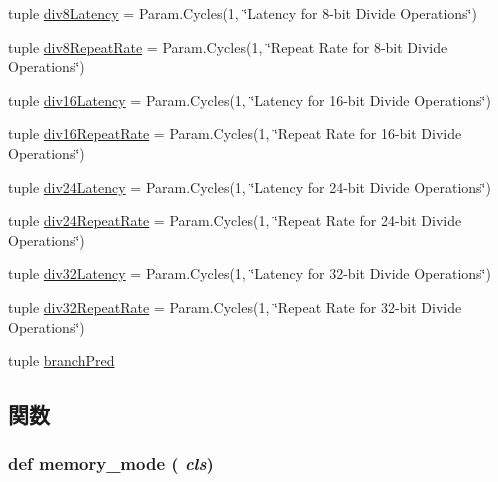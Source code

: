\begin{DoxyCompactItemize}
tuple \hyperlink{classInOrderCPU_1_1InOrderCPU_a833c322d9e4b4bef952d030a08320497}{div8Latency} = Param.Cycles(1, \char`\"{}Latency for 8-\/bit Divide Operations\char`\"{})
\item 
tuple \hyperlink{classInOrderCPU_1_1InOrderCPU_a736a65eafa168f467a9a36e107b331e6}{div8RepeatRate} = Param.Cycles(1, \char`\"{}Repeat Rate for 8-\/bit Divide Operations\char`\"{})
\item 
tuple \hyperlink{classInOrderCPU_1_1InOrderCPU_a060046a1d58d586e6d65b6dfb868ef96}{div16Latency} = Param.Cycles(1, \char`\"{}Latency for 16-\/bit Divide Operations\char`\"{})
\item 
tuple \hyperlink{classInOrderCPU_1_1InOrderCPU_a2a96d4b0aa6b3dfc9a5fcd7f830a51f9}{div16RepeatRate} = Param.Cycles(1, \char`\"{}Repeat Rate for 16-\/bit Divide Operations\char`\"{})
\item 
tuple \hyperlink{classInOrderCPU_1_1InOrderCPU_a54b0720449ef5f17f05d541a895c1017}{div24Latency} = Param.Cycles(1, \char`\"{}Latency for 24-\/bit Divide Operations\char`\"{})
\item 
tuple \hyperlink{classInOrderCPU_1_1InOrderCPU_ab804bac6417fc4bbdbf4cee8466a689c}{div24RepeatRate} = Param.Cycles(1, \char`\"{}Repeat Rate for 24-\/bit Divide Operations\char`\"{})
\item 
tuple \hyperlink{classInOrderCPU_1_1InOrderCPU_ab5c92c70e2ba81c832ffe484375fd29f}{div32Latency} = Param.Cycles(1, \char`\"{}Latency for 32-\/bit Divide Operations\char`\"{})
\item 
tuple \hyperlink{classInOrderCPU_1_1InOrderCPU_a5dc41b764ba517eb08a9d7297e292748}{div32RepeatRate} = Param.Cycles(1, \char`\"{}Repeat Rate for 32-\/bit Divide Operations\char`\"{})
\item 
tuple \hyperlink{classInOrderCPU_1_1InOrderCPU_ac566dd90d96e45183abc6f54c960ffec}{branchPred}
\end{DoxyCompactItemize}


\subsection{関数}
\hypertarget{classInOrderCPU_1_1InOrderCPU_a53d73a2f804df6a1dcabb22052d09773}{
\subsubsection[{memory\_\-mode}]{\setlength{\rightskip}{0pt plus 5cm}def memory\_\-mode ( {\em cls})}}
\label{classInOrderCPU_1_1InOrderCPU_a53d73a2f804df6a1dcabb22052d09773}



